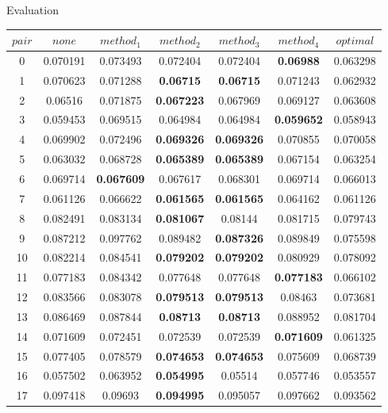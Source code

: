 \documentclass{beamer}
\begin{document}
\begin{frame}{Evaluation}
    \begin{table}[t]
\tiny
    \centering
    \begin{tabular}{c|c|c|c|c|c|c}
         $pair$ & $none$ & $method_1$ &  $method_2$ & $method_3$ & $method_4$ & $optimal$ \\
         \hline
0  & 0.070191 & 0.073493 & 0.072404 & 0.072404 & \textbf{0.06988} & 0.063298 \\
1  & 0.070623 & 0.071288 & \textbf{0.06715} & \textbf{0.06715} & 0.071243 & 0.062932 \\
2  & 0.06516 & 0.071875 & \textbf{0.067223} & 0.067969 & 0.069127 & 0.063608 \\
3  & 0.059453 & 0.069515 & 0.064984 & 0.064984 & \textbf{0.059652} & 0.058943 \\
4  & 0.069902 & 0.072496 & \textbf{0.069326} & \textbf{0.069326} & 0.070855 & 0.070058 \\
5  & 0.063032 & 0.068728 & \textbf{0.065389} & \textbf{0.065389} & 0.067154 & 0.063254 \\
6  & 0.069714 & \textbf{0.067609} & 0.067617 & 0.068301 & 0.069714 & 0.066013\\
7  & 0.061126 & 0.066622 & \textbf{0.061565} & \textbf{0.061565} & 0.064162 & 0.061126 \\
8  & 0.082491 & 0.083134 & \textbf{0.081067} &  0.08144 & 0.081715 & 0.079743 \\
9  & 0.087212 & 0.097762 & 0.089482 & \textbf{0.087326} & 0.089849 & 0.075598 \\
10  & 0.082214 & 0.084541 & \textbf{0.079202} & \textbf{0.079202}  & 0.080929 & 0.078092 \\
11  & 0.077183 & 0.084342 & 0.077648 & 0.077648 & \textbf{0.077183} & 0.066102 \\
12  &  0.083566 & 0.083078 & \textbf{0.079513} & \textbf{0.079513} & 0.08463 & 0.073681 \\
13  & 0.086469 & 0.087844 & \textbf{0.08713} & \textbf{0.08713} & 0.088952 & 0.081704 \\
14  & 0.071609 & 0.072451 & 0.072539 & 0.072539 & \textbf{0.071609} & 0.061325 \\
15  &  0.077405 & 0.078579 & \textbf{0.074653} & \textbf{0.074653} & 0.075609 & 0.068739 \\
16  & 0.057502 & 0.063952 & \textbf{0.054995} & 0.05514 & 0.057746 & 0.053557 \\
17  & 0.097418 & 0.09693 & \textbf{0.094995} & 0.095057 & 0.097662 & 0.093562 \\

\end{tabular}
\end{table}
\end{frame}
\end{document}
